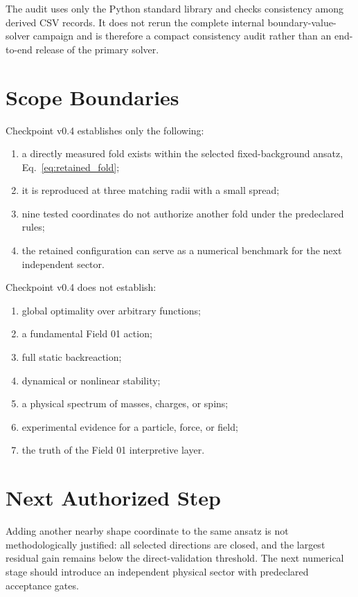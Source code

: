 \documentclass[11pt,a4paper]{article}
\begin{document}
The audit uses only the Python standard library and checks consistency among derived CSV records. It does not rerun the complete internal boundary-value-solver campaign and is therefore a compact consistency audit rather than an end-to-end release of the primary solver.

\section{Scope Boundaries}

Checkpoint v0.4 establishes only the following:
\begin{enumerate}
\item a directly measured fold exists within the selected fixed-background ansatz, Eq.~\eqref{eq:retained_fold};
\item it is reproduced at three matching radii with a small spread;
\item nine tested coordinates do not authorize another fold under the predeclared rules;
\item the retained configuration can serve as a numerical benchmark for the next independent sector.
\end{enumerate}

Checkpoint v0.4 does not establish:
\begin{enumerate}
\item global optimality over arbitrary functions;
\item a fundamental Field 01 action;
\item full static backreaction;
\item dynamical or nonlinear stability;
\item a physical spectrum of masses, charges, or spins;
\item experimental evidence for a particle, force, or field;
\item the truth of the Field 01 interpretive layer.
\end{enumerate}

\section{Next Authorized Step}

Adding another nearby shape coordinate to the same ansatz is not methodologically justified: all selected directions are closed, and the largest residual gain remains below the direct-validation threshold. The next numerical stage should introduce an independent physical sector with predeclared acceptance gates.
\end{document}
